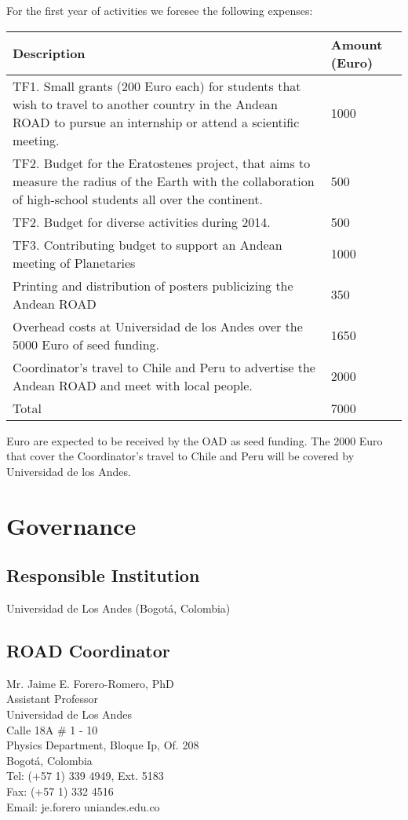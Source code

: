 \documentclass[12pt]{article}
\begin{document}
For the first year of activities we foresee the following expenses:

\begin{center}
\begin{tabular}{|p{11cm} |p{1.5cm}|}\hline\hline
Description &Amount (Euro) \\\hline
TF1. Small grants (200 Euro each) for students that wish to travel to
another country in the Andean ROAD to pursue an internship or attend a
scientific meeting. & 1000\\\hline
TF2. Budget for the Eratostenes project, that aims to measure the
radius of the Earth with the collaboration of high-school students all
over the continent. &500\\\hline
TF2. Budget for diverse activities during 2014.&500\\\hline
TF3. Contributing budget to support an Andean meeting of
Planetaries&1000\\\hline 
Printing and distribution of posters publicizing the Andean ROAD
&350\\\hline 
Overhead costs at Universidad de los Andes over the 5000 Euro of seed
funding. & 1650\\\hline 
Coordinator’s travel to Chile and Peru to advertise the Andean ROAD
and meet with local people.& 2000\\\hline 
Total &7000\\\hline\hline
\end{tabular}
\end{center}

 Euro are expected to be received by the OAD as seed funding. The
2000 Euro that cover the Coordinator’s travel to Chile and Peru will
be covered by Universidad de los Andes. 

\section{Governance}

\subsection*{Responsible Institution}
\noindent
Universidad de Los Andes (Bogotá, Colombia)

\subsection*{ROAD Coordinator}
\noindent
Mr. Jaime E. Forero-Romero, PhD\\
Assistant Professor\\
Universidad de Los Andes\\
Calle 18A \# 1 - 10\\
Physics Department, Bloque Ip, Of. 208\\
Bogot\'a, Colombia\\
Tel:  (+57 1) 339 4949, Ext. 5183\\
Fax: (+57 1) 332 4516 \\
Email: je.forero uniandes.edu.co\\
\end{document}
